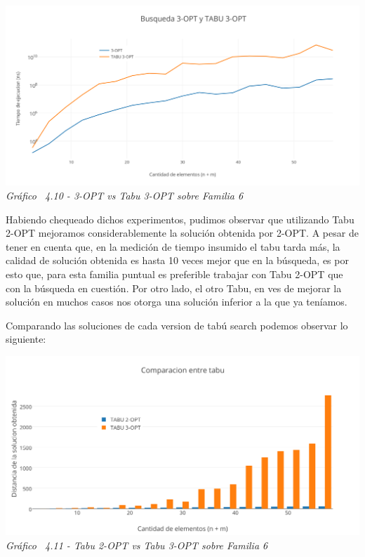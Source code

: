 \vspace*{0.3cm} \vspace*{0.3cm}
  \begin{center}
 \includegraphics[scale=0.5]{./EJ4/medicion3optsinorden.png}\\
 {            \textit{Gráfico \ 4.10 - 3-OPT vs Tabu 3-OPT sobre Familia 6}}
  \end{center}
  \vspace*{0.3cm}
  
Habiendo chequeado dichos experimentos, pudimos observar que utilizando Tabu 2-OPT mejoramos considerablemente la soluci\'on obtenida por 2-OPT. A pesar de tener en cuenta que, en la medici\'on de tiempo insumido el tabu tarda m\'as, la calidad de soluci\'on obtenida es hasta 10 veces mejor que en la b\'usqueda, es por esto que, para esta familia puntual es preferible trabajar con Tabu 2-OPT que con la b\'usqueda en cuesti\'on. 
Por otro lado, el otro Tabu, en ves de mejorar la soluci\'on en muchos casos nos otorga una soluci\'on inferior a la que ya ten\'iamos.
  
Comparando las soluciones de cada version de tabú search podemos observar lo siguiente:

\vspace*{0.3cm} \vspace*{0.3cm}
  \begin{center}
 \includegraphics[scale=0.5]{./EJ4/comparativosinorden.png}\\
 {            \textit{Gráfico \ 4.11 - Tabu 2-OPT vs Tabu 3-OPT sobre Familia 6}}
  \end{center}
  \vspace*{0.3cm}

